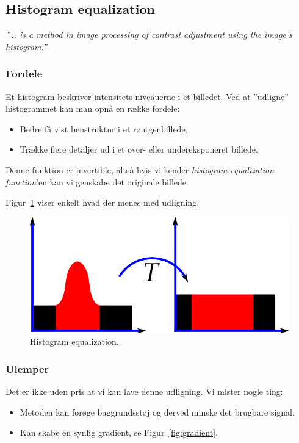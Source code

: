 \subsection{Histogram equalization}

\begin{center}
	\textit{''... is a method in image processing of contrast adjustment using the image's histogram.''}
\end{center}

\subsubsection{Fordele}

Et histogram beskriver intensitets-niveauerne i et billedet. Ved at ''udligne'' histogrammet kan man opnå en række fordele:

\begin{itemize}
	\item Bedre få vist benstruktur i et røntgenbillede.
	\item Trække flere detaljer ud i et over- eller undereksponeret billede.
\end{itemize}

Denne funktion er invertible, altså hvis vi kender \textit{histogram equalization function}'en kan vi genskabe det originale billede.

Figur~\ref{fig:histogram-eq} viser enkelt hvad der menes med udligning.

\begin{figure}[H]
	\centering
	\includegraphics[width=0.6\linewidth]{figs/spm01/histogram-eq.png}
	\caption{Histogram equalization.}
	\label{fig:histogram-eq}
\end{figure}

\subsubsection{Ulemper}
Det er ikke uden pris at vi kan lave denne udligning. Vi mister nogle ting:

\begin{itemize}
	\item Metoden kan forøge baggrundsstøj og derved minske det brugbare signal.
	\item Kan skabe en synlig gradient, se Figur~\ref{fig:gradient}.
\end{itemize}

